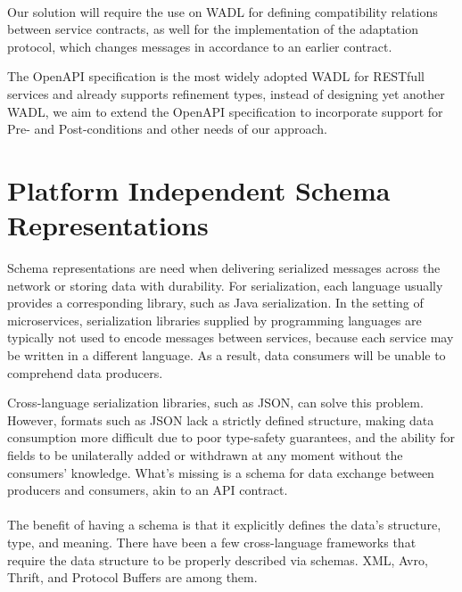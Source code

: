 \paragraph{}

Our solution will require the use on WADL for defining compatibility relations between service contracts,
as well for the implementation of the adaptation protocol, which changes messages in accordance to an earlier contract.

The OpenAPI specification is the most widely adopted WADL for RESTfull services and already supports refinement types, instead of designing yet another WADL,
we aim to extend the OpenAPI specification to incorporate support for Pre- and Post-conditions and other needs of our approach.

\section{Platform Independent Schema Representations} %
\label{sec:platform_independent_schema_representations}

Schema representations are need when delivering serialized messages across the network or storing data with durability.
For serialization, each language usually provides a corresponding library, such as Java serialization.
In the setting of microservices, serialization libraries supplied by programming languages are typically not used to encode messages between services,
because each service may be written in a different language. As a result, data consumers will be unable to comprehend data producers.

Cross-language serialization libraries, such as JSON, can solve this problem.
However, formats such as JSON lack a strictly defined structure,
making data consumption more difficult due to poor type-safety guarantees, and the ability for fields to be unilaterally added or withdrawn at any moment without the consumers' knowledge.
What's missing is a schema for data exchange between producers and consumers, akin to an API contract.

\paragraph{}

The benefit of having a schema is that it explicitly defines the data's structure, type, and meaning.
There have been a few cross-language frameworks that require the data structure to be properly described via schemas.
XML, Avro, Thrift, and Protocol Buffers \cite{8,9,10} are among them.

